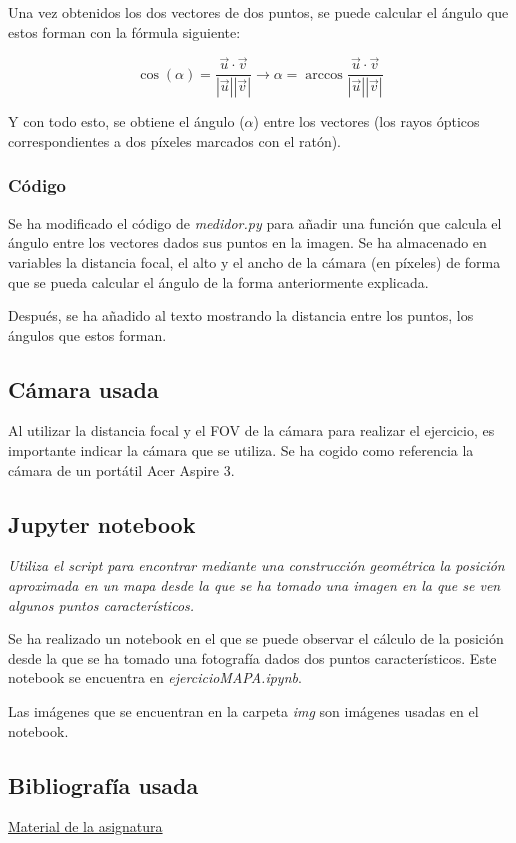 \documentclass[12pt]{article}
\begin{document}
Una vez obtenidos los dos vectores de dos puntos, se puede calcular el ángulo que estos forman con la fórmula siguiente:

\[
\cos(\alpha) = \frac{\vec{u} \cdot \vec{v}}{|\vec{u}| |\vec{v}|} \rightarrow \alpha = \arccos{\frac{\vec{u} \cdot \vec{v}}{|\vec{u}| |\vec{v}|}}
\]

Y con todo esto, se obtiene el ángulo ($\alpha$) entre los vectores (los rayos ópticos correspondientes a dos píxeles marcados con el ratón).

\subsubsection*{Código}

Se ha modificado el código de \textit{medidor.py} para añadir una función que calcula el ángulo entre los vectores dados sus puntos en la imagen. Se ha almacenado en variables la distancia focal, el alto y el ancho de la cámara (en píxeles) de forma que se pueda calcular el ángulo de la forma anteriormente explicada.

Después, se ha añadido al texto mostrando la distancia entre los puntos, los ángulos que estos forman.

\subsection*{Cámara usada}

Al utilizar la distancia focal y el FOV de la cámara para realizar el ejercicio, es importante indicar la cámara que se utiliza. Se ha cogido como referencia la cámara de un portátil Acer Aspire 3.

\subsection*{Jupyter notebook}

\textit{Utiliza el script para encontrar mediante una construcción geométrica la posición aproximada en un mapa desde la que se ha tomado una imagen en la que se ven algunos puntos característicos.}

Se ha realizado un notebook en el que se puede observar el cálculo de la posición desde la que se ha tomado una fotografía dados dos puntos característicos. Este notebook se encuentra en \textit{ejercicioMAPA.ipynb}.

Las imágenes que se encuentran en la carpeta \textit{img} son imágenes usadas en el notebook.

\subsection*{Bibliografía usada}
\href{https://github.com/albertoruiz/umucv/blob/master/notebooks/imagen.ipynb}{Material de la asignatura}
\end{document}
